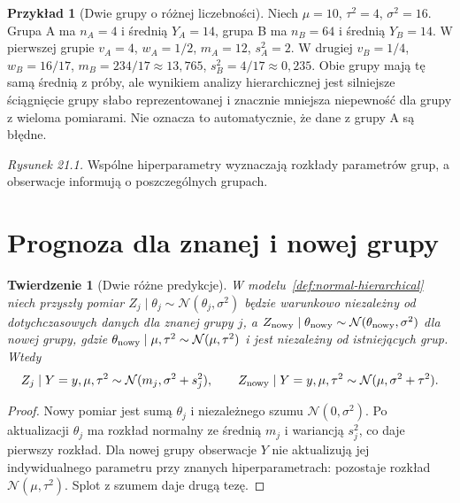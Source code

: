 \documentclass[11pt,a4paper,oneside]{report}
\numberwithin{equation}{chapter}
\theoremstyle{plain}
\newtheorem{twierdzenie}{Twierdzenie}[chapter]
\theoremstyle{definition}
\newtheorem{przyklad}{Przykład}[chapter]
\theoremstyle{remark}
\newcommand{\Normal}{\mathcal N}
\begin{document}
\begin{przyklad}[Dwie grupy o różnej liczebności]
Niech $\mu=10$, $\tau^2=4$, $\sigma^2=16$.
Grupa A ma $n_A=4$ i średnią $Y_A=14$, grupa B ma
$n_B=64$ i średnią $Y_B=14$. W pierwszej grupie
$v_A=4$, $w_A=1/2$, $m_A=12$, $s_A^2=2$.
W drugiej $v_B=1/4$, $w_B=16/17$, $m_B=234/17\approx13{,}765$,
$s_B^2=4/17\approx0{,}235$.
Obie grupy mają tę samą średnią z próby, ale wynikiem
analizy hierarchicznej jest silniejsze ściągnięcie grupy
słabo reprezentowanej i znacznie mniejsza niepewność
dla grupy z wieloma pomiarami. Nie oznacza to automatycznie,
że dane z grupy A są błędne.
\end{przyklad}

\begin{center}

{\small\emph{Rysunek 21.1.} Wspólne hiperparametry wyznaczają rozkłady parametrów grup, a obserwacje informują o poszczególnych grupach.}
\end{center}

\section{Prognoza dla znanej i nowej grupy}
\begin{twierdzenie}[Dwie różne predykcje]
\label{thm:hierarchical-predictive}
W modelu~\ref{def:normal-hierarchical} niech przyszły pomiar
$Z_j\mid\theta_j\sim\Normal(\theta_j,\sigma^2)$ będzie warunkowo
niezależny od dotychczasowych danych dla znanej grupy $j$,
a $Z_{\rm nowy}\mid\theta_{\rm nowy}\sim\Normal(\theta_{\rm nowy},\sigma^2)$
dla nowej grupy, gdzie $\theta_{\rm nowy}\mid\mu,\tau^2\sim\Normal(\mu,\tau^2)$
i jest niezależny od istniejących grup. Wtedy
\[
 Z_j\mid Y=y,\mu,\tau^2\sim\Normal(m_j,\sigma^2+s_j^2),
 \qquad Z_{\rm nowy}\mid Y=y,\mu,\tau^2\sim\Normal(\mu,\sigma^2+\tau^2).
\]
\end{twierdzenie}
\begin{proof}
Nowy pomiar jest sumą $\theta_j$ i niezależnego
szumu $\Normal(0,\sigma^2)$. Po aktualizacji $\theta_j$
ma rozkład normalny ze średnią $m_j$ i wariancją $s_j^2$,
co daje pierwszy rozkład. Dla nowej grupy obserwacje
$Y$ nie aktualizują jej indywidualnego parametru przy
znanych hiperparametrach: pozostaje rozkład
$\Normal(\mu,\tau^2)$. Splot z szumem daje drugą tezę.
\end{proof}
\end{document}
